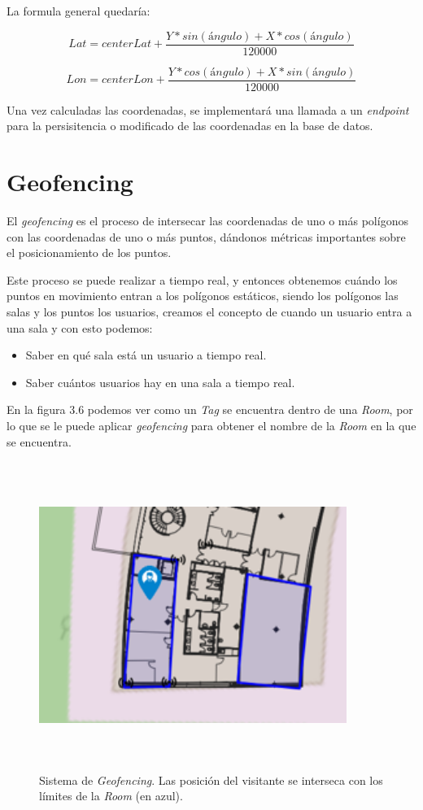 La formula general quedaría:

\[ Lat = centerLat + \frac{Y*sin(ángulo) + X*cos(ángulo)}{120000} \]

\[ Lon = centerLon + \frac{Y*cos(ángulo) + X*sin(ángulo)}{120000}  \]

Una vez calculadas las coordenadas, se implementará una llamada a un \textit{endpoint} para la persisitencia o modificado de las coordenadas en la base de datos.


\section{Geofencing}

El \textit{geofencing} es el proceso de intersecar las coordenadas de uno o más polígonos con las coordenadas de uno o más puntos, dándonos métricas importantes sobre el posicionamiento de los puntos.

Este proceso se puede realizar a tiempo real, y entonces obtenemos cuándo los puntos en movimiento entran a los polígonos estáticos, siendo los polígonos las salas y los puntos los usuarios, creamos el concepto de cuando un usuario entra a una sala y con esto podemos:

\begin{itemize}
    \item Saber en qué sala está un usuario a tiempo real.
    \item Saber cuántos usuarios hay en una sala a tiempo real.
\end{itemize}

En la figura 3.6 podemos ver como un \textit{Tag} se encuentra dentro de una \textit{Room}, por lo que se le puede aplicar \textit{geofencing} para obtener el nombre de la \textit{Room} en la que se encuentra.

\begin{figure}[t]
    \centering
    \includegraphics[width=10cm,height=10cm,keepaspectratio]{img/geofencing.png}
    \caption{Sistema de \textit{Geofencing}. Las posición del visitante se interseca con los límites de la \textit{Room} (en azul).}
    \label{fig:traslation_coordinates}
\end{figure}
